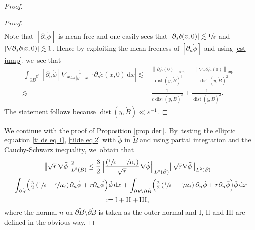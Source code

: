 \documentclass[10pt]{amsart}
\let\epsilon\varepsilon
\let\backslash\setminus
\newcommand{\rI}{\mathrm{I}}
\newcommand{\rII}{\mathrm{II}}
\newcommand{\rIII}{\mathrm{III}}
\theoremstyle{definition}
\DeclareMathOperator{\dist}{dist}
\newcommand\R{\mathbb{R}}
\newcommand\norm[1]{\left\lVert #1\right\rVert}
\newcommand\bnorm[1]{\bigl\lVert #1\bigr\rVert}
\newcommand\Bnorm[1]{\Bigl\lVert #1\Bigr\rVert}
\newcommand\dd{\,\mathrm{d}}
\newcommand\dx{\dd x}
\let\de\partial
\let\eps\epsilon
\let\mel\relax
\begin{document}
\begin{proof}
\begin{proof}
\begin{align*}
\end{align*}
Note that $[\de_n\grave{\phi}]$ is mean-free and one easily sees that $|\de_s\grave{c}(x,0)|\lesssim \sfrac{1}{\eps}$ and $|\nabla\de_s\grave{c}(x,0)|\lesssim\nobreak 1$. Hence by exploiting the mean-freeness of $[\de_n\grave{\phi}]$ and using \eqref{est jump}, we~see that
\begin{align*}
\left|\int_{\de\grave{B}^{\R^3}}[\de_n\grave{\phi}]\nabla_x\frac{1}{4\pi|y-x|}\cdot \de_s\grave{c}(x,0)\dx\right|\lesssim & \frac{\norm{\de_s\grave{c}(0)}_{\sup}}{\dist(y,\grave{B})^3}+\frac{\norm{\nabla_x\de_s\grave{c}(0)}_{\sup}}{\dist(y,\grave{B})^2}\\
\lesssim& \frac{1}{\eps\dist(y,\grave{B})^3}+\frac{1}{\dist(y,\grave{B})^2}.
\end{align*}
The statement follows because $\dist(y,\grave{B})\ll\eps^{-1}$.
\end{proof}

\pagebreak[2]
We continue with the proof of Proposition \ref{prop deri}. By~testing the elliptic equation \eqref{tilde eq 1}, \eqref{tilde eq 2} with $\tilde{\phi}$ in $\tilde{B}$ and using partial integration and the Cauchy-Schwarz inequality, we~obtain that\vspace*{-5pt}
\begin{multline}\label{est tilde}
\mel\bnorm{\sqrt{r}\,\nabla\tilde{\phi}}_{L^2(\tilde{B})}^2\leq \frac{3}{2}\Bnorm{\frac{\left(\sfrac{1}{\eps}-\sfrac{r}{R_j}\right)}{\sqrt{r}}\,\nabla\grave{\phi}}_{L^2(\tilde{B})}\bnorm{\sqrt{r}\nabla\tilde{\phi}}_{L^2(\tilde{B})}\\
-\int_{\de \grave{B}}\Bigl(\tfrac{3}{2}\left(\sfrac{1}{\eps}-\sfrac{r}{R_j}\right)\de_n\grave{\phi}+r\de_n\tilde{\phi}\Bigr)\tilde{\phi}\dx+\int_{\de \tilde{B}\backslash\de\grave{B}}\Bigl(\tfrac{3}{2}\left(\sfrac{1}{\eps}-\sfrac{r}{R_j}\right)\de_n\grave{\phi}+r\de_n\tilde{\phi}\Bigr)\tilde{\phi}\dx\\
\mel:=\rI+\rII+\rIII,
\end{multline}
where the normal $n$ on $\de \tilde{B}\backslash\de\grave{B}$ is taken as the outer normal and $\rI$, $\rII$ and $\rIII$ are defined in the obvious way.


\end{proof}
\end{document}
